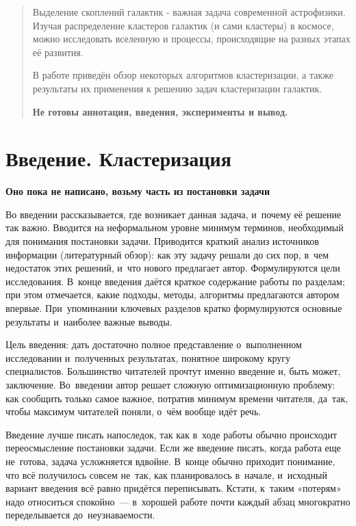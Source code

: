\documentclass[12pt,fleqn]{article}
\begin{document}
\newpage
\renewcommand{\contentsname}{Содержание}
\tableofcontents

\newpage
\begin{abstract}
    Выделение скоплений галактик - важная задача современной астрофизики. 
    Изучая распределение кластеров галактик (и сами кластеры) в космосе, можно исследовать вселенную и процессы, происходящие на разных этапах её развития. 
    
    В работе приведён обзор некоторых алгоритмов кластеризации, а также результаты их применения к решению задач кластеризации галактик.
    
    \textbf{Не готовы аннотация, введения, эксперименты и вывод. }
    
\end{abstract}

\newpage
\section{Введение. Кластеризация }
\textbf{Оно пока не написано, возьму часть из постановки задачи}

Во введении рассказывается, где возникает данная задача, и~почему её решение так важно.
Вводится на неформальном уровне минимум терминов, необходимый для понимания постановки задачи.
Приводится краткий анализ источников информации (литературный обзор):
как эту задачу решали до сих пор, в~чем недостаток этих решений, и~что нового предлагает автор.
Формулируются цели исследования.
В~конце введения даётся краткое содержание работы по разделам;
при этом отмечается, какие подходы, методы, алгоритмы предлагаются автором впервые.
При~упоминании ключевых разделов кратко формулируются основные результаты и~наиболее важные выводы.

Цель введения: дать достаточно полное представление о~выполненном исследовании
и~полученных результатах, понятное широкому кругу специалистов.
Большинство читателей прочтут именно введение и, быть может, заключение.
Во~введении автор решает сложную оптимизационную проблему:
как сообщить только самое важное, потратив минимум времени читателя,
да~так, чтобы максимум читателей поняли, о~чём вообще идёт речь.

Введение лучше писать напоследок, так как в~ходе работы обычно происходит переосмысление постановки задачи.
Если же введение писать, когда работа еще не~готова, задача усложняется вдвойне.
В~конце обычно приходит понимание, что всё получилось совсем не~так, как планировалось в~начале,
и~исходный вариант введения всё равно придётся переписывать.
Кстати, к~таким «потерям» надо относиться спокойно~--- в~хорошей работе почти каждый абзац многократно переделывается до~неузнаваемости.
\end{document}
